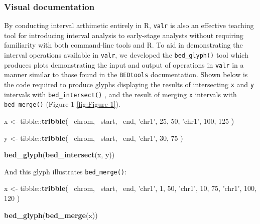 \documentclass[9pt,a4paper]{extarticle}
\renewcommand{\KeywordTok}[1]{\textbf{{#1}}}
\renewcommand{\DecValTok}[1]{\textcolor[rgb]{0.00,0.00,1.00}{{#1}}}
\renewcommand{\StringTok}[1]{\textcolor[rgb]{0.87,0.00,0.00}{{#1}}}
\renewcommand{\NormalTok}[1]{{#1}}
\begin{document}
\subsubsection*{Visual documentation}\label{visual-documentation}
By conducting interval arthimetic entirely in R, \texttt{valr} is also an effective teaching tool for introducing interval analysis to early-stage analysts without requiring familiarity with both command-line tools and R. To aid in demonstrating the interval operations available in \texttt{valr}, we developed the \texttt{bed\_glyph()} tool which produces plots demonstrating the input and output of operations in \texttt{valr} in a manner similar to those found in the \texttt{BEDtools} documentation.
Shown below is the code required to produce glyphs displaying the results of intersecting \texttt{x} and \texttt{y} intervals with \texttt{bed\_intersect()} , and the result of merging \texttt{x} intervals with \texttt{bed\_merge()} (Figure 1 \ref{fig:Figure 1}).

\begin{Highlighting}[]
\NormalTok{x <-}\StringTok{ }\NormalTok{tibble::}\KeywordTok{tribble}\NormalTok{(}
  \NormalTok{~chrom, ~start, ~end,}
  \StringTok{'chr1'}\NormalTok{, }\DecValTok{25}\NormalTok{,     }\DecValTok{50}\NormalTok{,}
  \StringTok{'chr1'}\NormalTok{, }\DecValTok{100}\NormalTok{,    }\DecValTok{125}
\NormalTok{)}

\NormalTok{y <-}\StringTok{ }\NormalTok{tibble::}\KeywordTok{tribble}\NormalTok{(}
  \NormalTok{~chrom, ~start, ~end,}
  \StringTok{'chr1'}\NormalTok{, }\DecValTok{30}\NormalTok{,     }\DecValTok{75}
\NormalTok{)}

\KeywordTok{bed_glyph}\NormalTok{(}\KeywordTok{bed_intersect}\NormalTok{(x, y))}
\end{Highlighting}

And this glyph illustrates \texttt{bed\_merge()}:

\begin{Highlighting}[]
\NormalTok{x <-}\StringTok{ }\NormalTok{tibble::}\KeywordTok{tribble}\NormalTok{(}
  \NormalTok{~chrom, ~start, ~end,}
  \StringTok{'chr1'}\NormalTok{,      }\DecValTok{1}\NormalTok{,      }\DecValTok{50}\NormalTok{,}
  \StringTok{'chr1'}\NormalTok{,      }\DecValTok{10}\NormalTok{,     }\DecValTok{75}\NormalTok{,}
  \StringTok{'chr1'}\NormalTok{,      }\DecValTok{100}\NormalTok{,    }\DecValTok{120}
\NormalTok{)}

\KeywordTok{bed_glyph}\NormalTok{(}\KeywordTok{bed_merge}\NormalTok{(x))}
\end{Highlighting}
%
\end{document}
